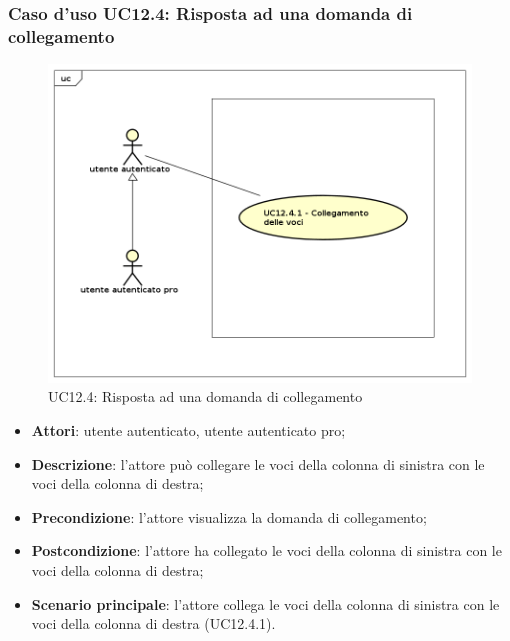 \subsubsection{Caso d'uso UC12.4: Risposta ad una domanda di collegamento}
\begin{figure}[h]
	\centering
	\includegraphics[scale=0.5]{UML/UC12_4.png}
	\caption{UC12.4: Risposta ad una domanda di collegamento}
\end{figure}
\begin{itemize}
\item \textbf{Attori}: utente autenticato, utente autenticato pro;
\item \textbf{Descrizione}: l'attore può collegare le voci della colonna di sinistra con le voci della colonna di destra;
\item \textbf{Precondizione}: l'attore visualizza la domanda di collegamento;
\item \textbf{Postcondizione}: l'attore ha collegato le voci della colonna di sinistra con le voci della colonna di destra;
\item \textbf{Scenario principale}: l'attore collega le voci della colonna di sinistra con le voci della colonna di destra (UC12.4.1).
\end{itemize}

\newpage
